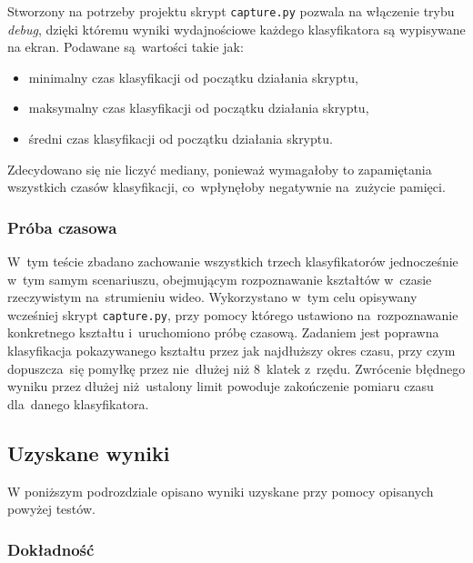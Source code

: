 \documentclass[11pt,a4paper]{article}
\begin{document}
Stworzony na potrzeby projektu skrypt \verb+capture.py+ pozwala na włączenie trybu \emph{debug}, dzięki któremu wyniki wydajnościowe każdego klasyfikatora są wypisywane na ekran. Podawane są~wartości takie jak:
\begin{itemize}
    \item minimalny czas klasyfikacji od początku działania skryptu,
    \item maksymalny czas klasyfikacji od początku działania skryptu,
    \item średni czas klasyfikacji od początku działania skryptu.
\end{itemize}
Zdecydowano się nie liczyć mediany, ponieważ wymagałoby to zapamiętania wszystkich czasów klasyfikacji, co~wpłynęłoby negatywnie na~zużycie pamięci.

\subsubsection{Próba czasowa}

W~tym teście zbadano zachowanie wszystkich trzech klasyfikatorów jednocześnie w~tym samym scenariuszu, obejmującym rozpoznawanie kształtów w~czasie rzeczywistym na~strumieniu wideo. Wykorzystano w~tym celu opisywany wcześniej skrypt \verb+capture.py+, przy pomocy którego ustawiono na~rozpoznawanie konkretnego kształtu i~uruchomiono próbę czasową. Zadaniem jest poprawna klasyfikacja pokazywanego kształtu przez jak najdłuższy okres czasu, przy czym dopuszcza~się pomyłkę przez nie~dłużej niż 8~klatek z~rzędu. Zwrócenie błędnego wyniku przez dłużej niż~ustalony limit powoduje zakończenie pomiaru czasu dla~danego klasyfikatora.

\subsection{Uzyskane wyniki}

W poniższym podrozdziale opisano wyniki uzyskane przy pomocy opisanych powyżej testów.

\subsubsection{Dokładność}
\end{document}
